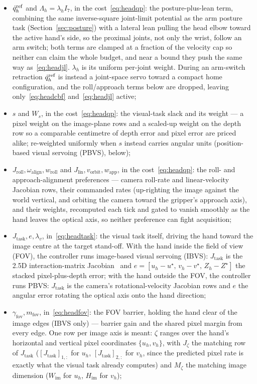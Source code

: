 \begin{itemize}[nosep]
\item $\dot{q}_h^{\text{ref}}$ and $\Lambda_h = \lambda_h I_7$, in the cost~\eqref{eq:headqp}: the posture-plus-lean term, combining the same inverse-square joint-limit potential as the arm posture task (Section~\ref{sec:posture}) with a lateral lean pulling the head elbow toward the active hand's side, so the proximal joints, not only the wrist, follow an arm switch; both terms are clamped at a fraction of the velocity cap so neither can claim the whole budget, and near a bound they push the same way as~\eqref{eq:headjl}. $\lambda_h$ is its uniform per-joint weight. During an arm-switch retraction $\dot{q}_h^{\text{ref}}$ is instead a joint-space servo toward a compact home configuration, and the roll/approach terms below are dropped, leaving only~\eqref{eq:headcbf} and~\eqref{eq:headjl} active;
\item $s$ and $W_s$, in the cost~\eqref{eq:headqp}: the visual-task slack and its weight --- a pixel weight on the image-plane rows and a scaled-up weight on the depth row so a comparable centimetre of depth error and pixel error are priced alike; re-weighted uniformly when $s$ instead carries angular units (position-based visual servoing (PBVS), below);
\item $J_{\text{roll}}, \omega_{\text{align}}, w_{\text{roll}}$ and $J_{\text{lin}}, v_{\text{orbit}}, w_{\text{app}}$, in the cost~\eqref{eq:headqp}: the roll- and approach-alignment preferences --- camera roll-rate and linear-velocity Jacobian rows, their commanded rates (up-righting the image against the world vertical, and orbiting the camera toward the gripper's approach axis), and their weights, recomputed each tick and gated to vanish smoothly as the hand leaves the optical axis, so neither preference can fight acquisition;
\item $J_{\text{task}}, e, \lambda_v$, in~\eqref{eq:headtask}: the visual task itself, driving the hand toward the image centre at the target stand-off. With the hand inside the field of view (FOV), the controller runs image-based visual servoing (IBVS): $J_{\text{task}}$ is the 2.5D interaction-matrix Jacobian~\cite{malis1999,chaumette2006} and $e = [u_h-u^{\star},\,v_h-v^{\star},\,Z_h-Z^{\star}]$ the stacked pixel-plus-depth error; with the hand outside the FOV, the controller runs PBVS: $J_{\text{task}}$ is the camera's rotational-velocity Jacobian rows and $e$ the angular error rotating the optical axis onto the hand direction;
\item $\gamma_{\text{fov}}, m_{\text{fov}}$, in~\eqref{eq:headfov}: the FOV barrier, holding the hand clear of the image edges (IBVS only) --- barrier gain and the shared pixel margin from every edge. One row per image axis is meant: $\zeta$ ranges over the hand's horizontal and vertical pixel coordinates $\{u_h, v_h\}$, with $J_{\zeta}$ the matching row of $J_{\text{task}}$ ($[J_{\text{task}}]_{1,:}$ for $u_h$, $[J_{\text{task}}]_{2,:}$ for $v_h$, since the predicted pixel rate is exactly what the visual task already computes) and $M_{\zeta}$ the matching image dimension ($W_{\text{im}}$ for $u_h$, $H_{\text{im}}$ for $v_h$);

\end{itemize}
